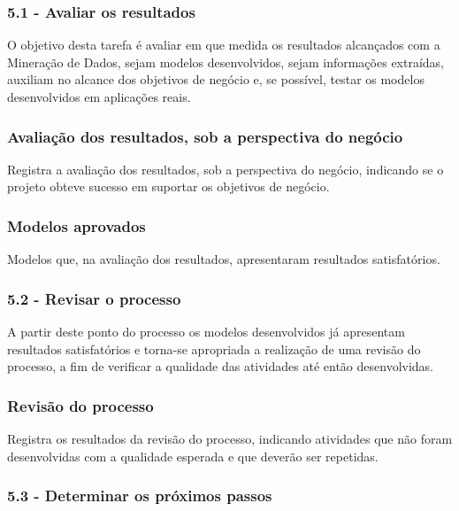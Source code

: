 
\subsubsection*{\textbf{5.1 - Avaliar os resultados}}

O objetivo desta tarefa é avaliar em que medida os resultados alcançados com a Mineração de Dados, sejam modelos desenvolvidos, sejam informações extraídas, auxiliam no alcance dos objetivos de negócio e, se possível, testar os modelos desenvolvidos em aplicações reais.

\subsubsection*{Avaliação dos resultados, sob a perspectiva do negócio}

Registra a avaliação dos resultados, sob a perspectiva do negócio, indicando se o projeto obteve sucesso em suportar os objetivos de negócio.

\subsubsection*{Modelos aprovados}

Modelos que, na avaliação dos resultados, apresentaram resultados satisfatórios.

\subsubsection*{\textbf{5.2 - Revisar o processo}}

A partir deste ponto do processo os modelos desenvolvidos já apresentam resultados satisfatórios e torna-se apropriada a realização de uma revisão do processo, a fim de verificar a qualidade das atividades até então desenvolvidas.

\subsubsection*{Revisão do processo}

Registra os resultados da revisão do processo, indicando atividades que não foram desenvolvidas com a qualidade esperada e que deverão ser repetidas.

\subsubsection*{\textbf{5.3 - Determinar os próximos passos}}

